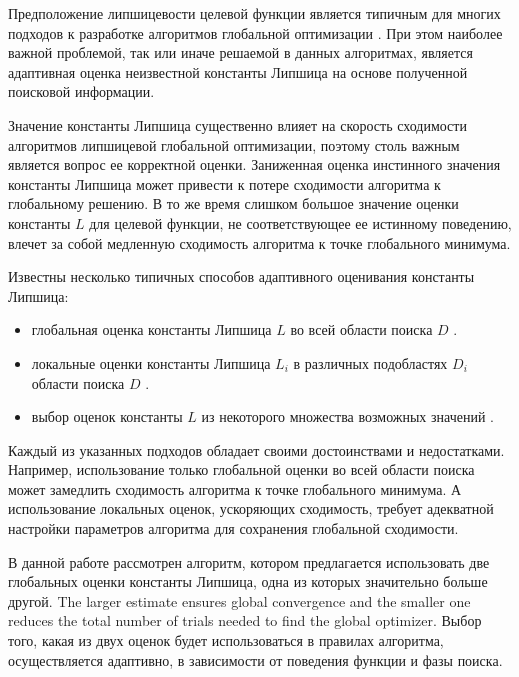 \documentclass[runningheads]{llncs}
\begin{document}
Предположение липшицевости целевой функции является типичным для многих подходов к разработке алгоритмов глобальной оптимизации \cite{Pinter1996,Strongin2000,Zilinskas2010,Evtushenko2013}. При этом наиболее важной проблемой, так или иначе решаемой в данных алгоритмах, является адаптивная оценка неизвестной константы Липшица на основе полученной поисковой информации. 

Значение константы Липшица существенно влияет на скорость сходимости алгоритмов липшицевой глобальной оптимизации, поэтому столь важным является вопрос ее корректной оценки. Заниженная оценка инстинного значения константы Липшица может привести к потере сходимости алгоритма к глобальному решению. В то же время слишком большое значение оценки константы $L$ для целевой функции, %
не соответствующее ее истинному поведению, влечет за собой медленную сходимость алгоритма к точке глобального минимума. 

Известны несколько типичных способов адаптивного оценивания константы Липшица:
\begin{itemize}
	\item глобальная оценка константы Липшица $L$ во всей области поиска $D$ \cite{Horst1996,Pinter1996,Strongin2000}.
	\item локальные оценки константы Липшица $L_i$ в различных подобластях $D_i$ области поиска $D$ \cite{Kvasov2003,Sergeyev2010,Sergeyev2016}.
	\item выбор оценок константы $L$ из некоторого множества возможных значений \cite{Jones1993,Gablonsky2001,Jones2009,Sergeyev2006}.
\end{itemize}

Каждый из указанных подходов обладает своими достоинствами и недостатками. Например, использование только глобальной оценки во всей области поиска может замедлить сходимость алгоритма к точке глобального минимума. А использование локальных оценок, ускоряющих сходимость, требует адекватной настройки параметров алгоритма для сохранения глобальной сходимости. 

В данной работе рассмотрен алгоритм, котором предлагается использовать две глобальных оценки константы Липшица, одна из которых значительно больше другой. 
The larger estimate ensures global convergence and the smaller one reduces the total number of trials needed to find the global optimizer.
Выбор того, какая из двух оценок будет использоваться в правилах алгоритма, осуществляется адаптивно, в зависимости от поведения функции и фазы поиска.
\end{document}
